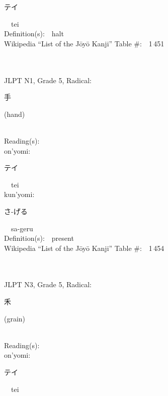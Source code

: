 \begin{multicols}{2}
{\hspace*{2em}}{\begin{CJK}{UTF8}{min} テイ \end{CJK}}\ \ tei\ \ \\
Definition(s):\ \ halt \\
Wikipedia ``List of the J\=oy\=o Kanji'' Table \#:\ \ 1\,451 \\
\ \ \\
{\fontsize{34pt}{40pt}  }\ \ \\  %
{JLPT N1, Grade 5, Radical:\ \ {\begin{CJK}{UTF8}{min} 手 \end{CJK}} (hand) } \\
Reading(s):\ \ \\
{\hspace*{1em}}on'yomi:\ \ \\
{\hspace*{2em}}{\begin{CJK}{UTF8}{min} テイ \end{CJK}}\ \ tei\ \ \\
{\hspace*{1em}}kun'yomi:\ \ \\
{\hspace*{2em}}{\begin{CJK}{UTF8}{min} さ-げる \end{CJK}}\ \ sa-geru\ \ \\
Definition(s):\ \ present \\
Wikipedia ``List of the J\=oy\=o Kanji'' Table \#:\ \ 1\,454 \\
\ \ \\
{\fontsize{34pt}{40pt}  }\ \ \\  %
{JLPT N3, Grade 5, Radical:\ \ {\begin{CJK}{UTF8}{min} 禾 \end{CJK}} (grain) } \\
Reading(s):\ \ \\
{\hspace*{1em}}on'yomi:\ \ \\
{\hspace*{2em}}{\begin{CJK}{UTF8}{min} テイ \end{CJK}}\ \ tei\ \ \\

\end{multicols}
